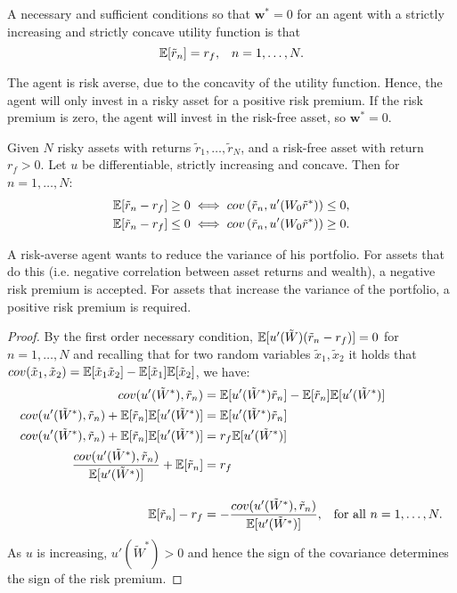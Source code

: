 \documentclass[twoside, titlepage]{article}
\begin{document}
\begin{proposition}
 A necessary and sufficient conditions so that $\mathbf{w}^* = 0$ for an agent with a strictly increasing and strictly concave utility function is that
\[
    \mathbb{E}[\tilde{r}_n]  = r_f, \;\;\; n = 1, \dots, N.
\]
\begin{explanation}
    The agent is risk averse, due to the concavity of the utility function. Hence, the agent will only invest in a risky asset for a positive risk premium. If the risk premium is zero, the agent will invest in the risk-free asset, so $\mathbf{w}^* = 0$.
\end{explanation}
\end{proposition}

\begin{proposition}[Proposition 2.5] %
    Given $N$ risky assets with returns $\tilde{r}_1, \dots, \tilde{r}_N$, and a risk-free asset with return $r_f > 0$. Let $u$ be differentiable, strictly increasing and concave. Then for $n = 1, \dots, N$:
    \begin{align*}
        \mathbb{E}[\tilde{r}_n - r_f] &\geq 0 \iff cov\left(\tilde{r}_n, u'(W_0\tilde{r}^*)\right) \leq 0, \\
        \mathbb{E}[\tilde{r}_n - r_f] &\leq 0 \iff cov\left(\tilde{r}_n, u'(W_0\tilde{r}^*)\right) \geq 0.
    \end{align*}
    \begin{explanation}
        A risk-averse agent wants to reduce the variance of his portfolio. For assets that do this (i.e. negative correlation between asset returns and wealth), a negative risk premium is accepted. For assets that increase the variance of the portfolio, a positive risk premium is required.
    \end{explanation}
\end{proposition}

\begin{proof}
    By the first order necessary condition, $\mathbb{E}[u'(\tilde{W})(\tilde{r}_n - r_f)] = 0$ for $n = 1, \dots, N$ and recalling that for two random variables $\tilde{x}_1, \tilde{x}_2$ it holds that $cov(\tilde{x}_1, \tilde{x}_2) = \mathbb{E}[\tilde{x}_1\tilde{x}_2] - \mathbb{E}[\tilde{x}_1]\mathbb{E}[\tilde{x}_2]$, we have:
    \begin{align*}
        cov(u'(\tilde{W}^*), \tilde{r}_n) &= \mathbb{E}[u'(\tilde{W}^*)\tilde{r}_ n] - \mathbb{E}[\tilde{r}_n]\mathbb{E}[u'(\tilde{W}^*)] \\
        cov(u'(\tilde{W}^*), \tilde{r}_n) + \mathbb{E}[\tilde{r}_n]\mathbb{E}[u'(\tilde{W}^*)] &= \mathbb{E}[u'(\tilde{W}^*)\tilde{r}_n] \\
        cov(u'(\tilde{W}^*), \tilde{r}_n) + \mathbb{E}[\tilde{r}_n]\mathbb{E}[u'(\tilde{W}^*)] &= r_f\mathbb{E}[u'(\tilde{W}^*)] \\
        \frac{cov(u'(\tilde{W}^*), \tilde{r}_n)}{\mathbb{E}[u'(\tilde{W}^*)]} + \mathbb{E}[\tilde{r}_n] &= r_f \\[10pt]
         \mathbb{E}[\tilde{r}_n] - r_f &= - \frac{cov(u'(\tilde{W}^*), \tilde{r}_n)}{\mathbb{E}[u'(\tilde{W}^*)]}, \;\;\; \text{for all } n = 1, \dots, N.
    \end{align*}
    As $u$ is increasing, $u'(\tilde{W}^*) > 0$ and hence the sign of the covariance determines the sign of the risk premium.
\end{proof}
\end{document}
